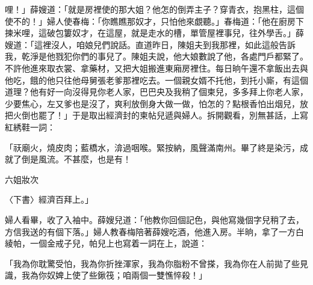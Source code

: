 哩！」薛嫂道：「就是房裡使的那大姐？他怎的倒弄主子？穿青衣，抱黑柱，這個使不的！」婦人使春梅：「你瞧瞧那奴才，只怕他來覷聽。」春梅道：「他在廚房下揀米哩，這破包簍奴才，在這屋，就是走水的槽，單管屋裡事兒，往外學舌。」薛嫂道：「這裡沒人，咱娘兒們說話。直道昨日，陳姐夫到我那裡，如此這般告訴我，乾淨是他戮犯你們的事兒了。陳姐夫說，他大娘數說了他，各處門戶都緊了。不許他進來取衣裳、拿藥材，又把大姐搬進東廂房裡住。每日晌午還不拿飯出去與他吃，餓的他只往他母舅張老爹那裡吃去。一個親女婿不托他，到托小廝，有這個道理？他有好一向沒得見你老人家，巴巴央及我稍了個柬兒，多多拜上你老人家，少要焦心，左又爹也是沒了，爽利放倒身大做一做，怕怎的？點根香怕出烟兒，放把火倒也罷了！」于是取出經濟封的柬帖兒遞與婦人。拆開觀看，別無甚話，上寫紅綉鞋一詞：

「祆廟火，燒皮肉；藍橋水，渰過咽喉。緊按納，風聲滿南州。畢了終是染污，成就了倒是風流。不甚麼，也是有！

六姐妝次

〈下書〉經濟百拜上。」

婦人看畢，收了入袖中。薛嫂兒道：「他教你回個記色，與他寫幾個字兒稍了去，方信我送的有個下落。」婦人教春梅陪著薛嫂吃酒，他進入房。半晌，拿了一方白綾帕，一個金戒子兒，帕兒上也寫着一詞在上，說道：

「我為你耽驚受怕，我為你折挫渾家，我為你脂粉不曾搽，我為你在人前拋了些見識，我為你奴婢上使了些鍬筏；咱兩個一雙憔悴殺！」

